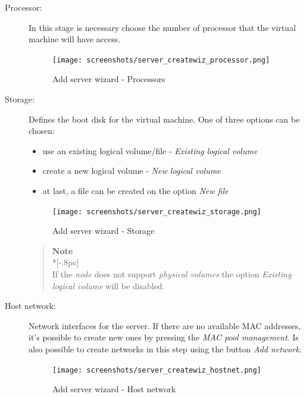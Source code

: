 \begin{description}
	\item[Processor:] In this stage is necessary choose the number of processor that the virtual machine will have access.
		\begin{figure}[H]
        		\begin{center}
		        \texttt{[image: screenshots/server\_createwiz\_processor.png]}
        		\caption{Add server wizard - Processors}
		        \label{fig:server_createwiz_processor}
	        	\end{center}
		\end{figure}

	\item[Storage:] Defines the boot disk for the virtual machine. One of three options can be chosen:
\begin{itemize}
	\item use an existing logical volume/file - \emph{Existing logical volume}
	\item create a new logical volume - \emph{New logical volume}
	\item at last, a file can be created on the option \emph{New file}
\end{itemize}

        \begin{figure}[H]
        		\begin{center}
	        	\texttt{[image: screenshots/server\_createwiz\_storage.png]}
	        	\caption{Add server wizard - Storage}
		        \label{fig:server_createwiz_storage}
        		\end{center}
		\end{figure}

		\begin{quote}
			{\large \bf Note} \\*[-.8pc]
			\underline{\hspace{6in}} \\
            If the \emph{node} does not support \emph{physical volumes} the option \emph{Existing logical volume} will be disabled.
		\end{quote}		
        
        
        \item[Host network:] Network interfaces for the server. If there are no available MAC addresses, it's possible to create new ones by pressing the \emph{MAC pool management}. Is also possible to create networks in this step using the button \emph{Add network}.
		\begin{figure}[H]
        		\begin{center}
	        	\texttt{[image: screenshots/server\_createwiz\_hostnet.png]}
	        	\caption{Add server wizard - Host network}
		        \label{fig:server_createwiz_hostnet}
        		\end{center}
		\end{figure}


\end{description}

